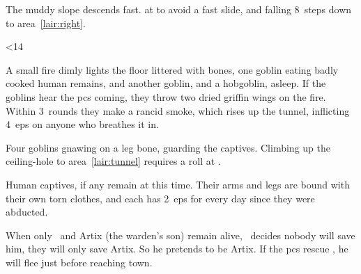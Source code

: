 \documentclass[10pt,twoside]{book}
\begin{document}

The muddy slope descends fast.
 at \tn[8] to avoid a fast slide, and falling 8~\glspl{step} down to \gls{area}~\ref{lair:right}.%

\ifnum\thepage<14
\fi


A small fire dimly lights the floor littered with bones, one goblin eating badly cooked human remains, and another goblin, and a hobgoblin, asleep.
If the goblins hear the \glspl{pc} coming, they throw two dried \gls{griffin} wings on the fire.
Within 3~\glspl{round} they make a rancid smoke, which rises up the tunnel, inflicting 4~\glspl{ep} on anyone who breathes it in.%

Four goblins gnawing on a leg bone, guarding the captives.
Climbing up the ceiling-hole to \gls{area}~\ref{lair:tunnel} requires a  roll at \tn[12].


Human captives, if any remain at this time.
Their arms and legs are bound with their own torn clothes, and each has 2~\glspl{ep} for every day since they were abducted.

When only \composeHumanName\ and Artix (the \gls{warden}'s son) remain alive, \currentName\ decides nobody will save him, they will only save Artix.
So he pretends to be Artix.
If the \glspl{pc} rescue \currentName, he will flee just before reaching town.
\end{document}
